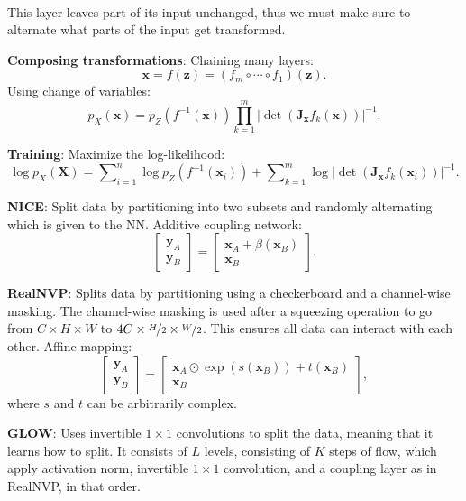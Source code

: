 \documentclass{article}
\renewcommand{\vec}[1]{\bm{#1}}
\newcommand{\mat}[1]{\bm{#1}}
\newenvironment{topic}[1]
{\textbf{\sffamily \colorbox{black}{\rlap{\textbf{\textcolor{white}{#1}}}\hspace{\linewidth}\hspace{-2\fboxsep}}} \\ \vspace{0.2cm}}
{}
\begin{document}
\begin{multicols*}{2}
\begin{topic}{Normalizing flow}
        This layer leaves part of its input unchanged, thus we must make sure to alternate what parts of
        the input get transformed.

        \textbf{Composing transformations}: Chaining many layers: \[
            \vec{x} = f(\vec{z}) = (f_m \circ \cdots \circ f_1)(\vec{z}).
        \]
        Using change of variables: \[
            p_X(\vec{x}) = p_Z(f^{-1}(\vec{x})) \prod_{k=1}^m |\det(\mat{J}_{\vec{x}} f_k(\vec{x}))|^{-1}.
        \]

        \textbf{Training}: Maximize the log-likelihood: \[
            \log p_{X}(\mat{X}) = \sum\nolimits_{i=1}^{n} \log p_Z(f^{-1}(\vec{x}_i)) + \sum\nolimits_{k=1}^{m} \log |\det(\mat{J}_{\vec{x}} f_k(\vec{x}_i))|^{-1}.
        \]

        \textbf{NICE}: Split data by partitioning into two subsets and randomly alternating which is given to the NN. Additive coupling network: \[
            \begin{bmatrix} \vec{y}_A \\ \vec{y}_B \end{bmatrix}
            =
            \begin{bmatrix} \vec{x}_A + \beta(\vec{x}_B) \\ \vec{x}_B \end{bmatrix}.
        \]

        \textbf{RealNVP}: Splits data by partitioning using a checkerboard and a channel-wise
        masking. The channel-wise masking is used after a squeezing operation to go from $C\times H
            \times W$ to $4C \times \nicefrac{H}{2} \times \nicefrac{W}{2}$. This ensures all data can interact with each other. Affine mapping: \[
            \begin{bmatrix} \vec{y}_A \\ \vec{y}_B \end{bmatrix} = \begin{bmatrix} \vec{x}_A \odot \exp(s(\vec{x}_B)) + t(\vec{x}_B) \\ \vec{x}_B \end{bmatrix},
        \]
        where $s$ and $t$ can be arbitrarily complex.

        \textbf{GLOW}: Uses invertible $1\times 1$ convolutions to split the data, meaning that it
        learns how to split. It consists of $L$ levels, consisting of $K$ steps of flow, which apply
        activation norm, invertible $1 \times 1$ convolution, and a coupling layer as in RealNVP, in
        that order.


\end{topic}
\end{multicols*}
\end{document}
